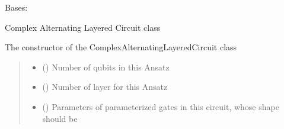 \documentclass[letterpaper,10pt,english]{sphinxmanual}
\begin{document}
\begin{fulllineitems}
\label{\detokenize{qcompute_qapp.circuit:qcompute_qapp.circuit.ComplexAlternatingLayeredCircuit}}
\pysigstartsignatures
{}
\pysigstopsignatures
\sphinxAtStartPar
Bases: {\hyperref[\detokenize{qcompute_qapp.circuit:qcompute_qapp.circuit.ParameterizedCircuit}]{}}

\sphinxAtStartPar
Complex Alternating Layered Circuit class

\sphinxAtStartPar
The constructor of the ComplexAlternatingLayeredCircuit class
\begin{quote}\begin{description}
\begin{itemize}
\item {} 
\sphinxAtStartPar
{} () \textendash{} Number of qubits in this Ansatz

\item {} 
\sphinxAtStartPar
{} () \textendash{} Number of layer for this Ansatz

\item {} 
\sphinxAtStartPar
{} () \textendash{} Parameters of parameterized gates in this circuit, whose shape
should be 

\end{itemize}

\end{description}\end{quote}


\end{fulllineitems}
\end{document}
